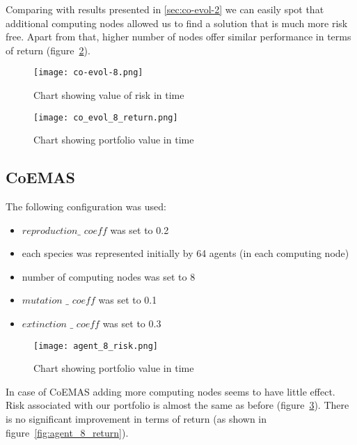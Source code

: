 Comparing with results presented in \ref{sec:co-evol-2} we can easily spot that additional computing nodes allowed us to find a solution that is much more risk free.
Apart from that, higher number of nodes offer similar performance in terms of return (figure~\ref{fig:co_evol_8_return}).

\begin{figure}[ht]
  \begin{center}
    \texttt{[image: co-evol-8.png]}
  \end{center}
  \caption{Chart showing value of risk in time}
  \label{fig:co_evol_8_risk}
\end{figure}

\begin{figure}[ht]
  \begin{center}
    \texttt{[image: co\_evol\_8\_return.png]}
  \end{center}
  \caption{Chart showing portfolio value in time}
  \label{fig:co_evol_8_return}
\end{figure}

\subsection{CoEMAS}

The following configuration was used:
\begin{itemize}
  \item $reproduction\_$ $coeff$ was set to 0.2
  \item each species was represented initially by 64 agents (in each computing node)
  \item number of computing nodes was set to 8
  \item $mutation$ $\_$ $coeff$ was set to 0.1
  \item $extinction$ $\_$ $coeff$ was set to 0.3
\end{itemize}


\begin{figure}[ht]
  \begin{center}
    \texttt{[image: agent\_8\_risk.png]}
  \end{center}
  \caption{Chart showing portfolio value in time}
  \label{fig:agent_8_risk}
\end{figure}

In case of CoEMAS adding more computing nodes seems to have little effect.
Risk associated with our portfolio is almost the same as before (figure~\ref{fig:agent_8_risk}).
There is no significant improvement in terms of return (as shown in figure~\ref{fig:agent_8_return}). 


